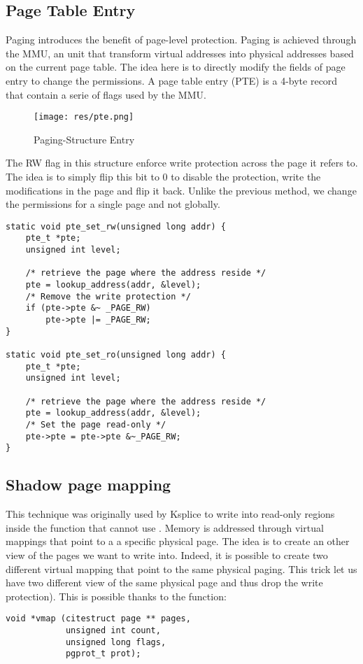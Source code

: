 \subsection{Page Table Entry}
Paging introduces the benefit of page-level protection.
Paging is achieved through the MMU, an unit that transform virtual addresses
into physical addresses based on the current page table.
The idea here is to directly modify the fields of page entry to change the
permissions.
A page table entry (PTE) is a 4-byte record that contain a serie of flags
used by the MMU.\\
\begin{figure}[h]
  \center
  \texttt{[image: res/pte.png]}
  \caption{Paging-Structure Entry}
\end{figure}

The RW flag in this structure enforce write protection across the page it
refers to. The idea is to simply flip this bit to 0 to disable the protection,
write the modifications in the page and flip it back.
Unlike the previous method, we change the permissions for a single page and
not globally.

\begin{lstlisting}[frame=single]
static void pte_set_rw(unsigned long addr) {
    pte_t *pte;
    unsigned int level;

    /* retrieve the page where the address reside */
    pte = lookup_address(addr, &level);
    /* Remove the write protection */
    if (pte->pte &~ _PAGE_RW)
        pte->pte |= _PAGE_RW;
}

static void pte_set_ro(unsigned long addr) {
    pte_t *pte;
    unsigned int level;

    /* retrieve the page where the address reside */
    pte = lookup_address(addr, &level);
    /* Set the page read-only */
    pte->pte = pte->pte &~_PAGE_RW;
}
\end{lstlisting}

\subsection{Shadow page mapping}
This technique was originally used by Ksplice\cite{ksplice} to write into
read-only regions inside the  function that cannot use
.
Memory is addressed through virtual mappings that point to a a specific
physical page.
The idea is to create an other view of the pages we want to write into.
Indeed, it is possible to  create two different virtual mapping that point to
the same physical paging. This trick let us have two different view of the same
physical page and thus drop the write protection).
This is possible thanks to the  function:
\vspace{-3mm}
\begin{lstlisting}[frame=single]
void *vmap (citestruct page ** pages,
            unsigned int count,
            unsigned long flags,
            pgprot_t prot);
\end{lstlisting}

